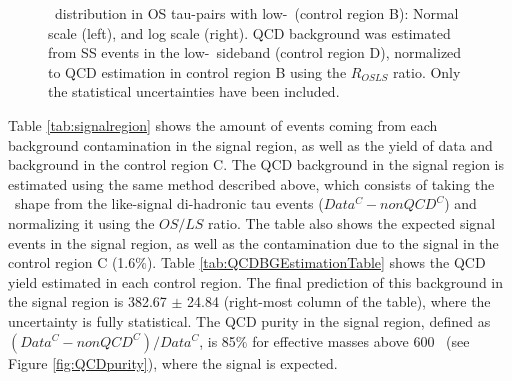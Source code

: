  \begin{figure}[ht]
 \begin{center}
 \captionsetup[subfloat]{farskip=0pt,captionskip=0.0cm,labelformat=empty}
 \end{center}
 \caption{\mass~distribution in OS tau-pairs with low-\MET~(control region B): Normal scale (left),
 and log scale (right). QCD background was estimated from SS events in the 
 low-\MET~sideband (control region D), normalized to QCD estimation in control region B 
 using the $R_{OSLS}$ ratio. Only the statistical uncertainties have been included.}
  \label{fig:CR_B}
 \end{figure}
 
\noindent Table \ref{tab:signalregion} shows the amount of events coming from each
background contamination in the signal region, as well as the yield of 
data and background in the control region C. The QCD background in the signal 
region is estimated using the same method described above, which consists of taking the \mass~shape
from the like-signal di-hadronic tau events ($Data^{C} - nonQCD^{C}$) and normalizing
it using the $OS/LS$ ratio. The table also shows the expected signal events in the signal 
region, as well as the contamination due to the signal in the control region C (1.6$\%$). Table \ref{tab:QCDBGEstimationTable} shows 
the QCD yield estimated in each control region. The final prediction of this background in the signal region 
is 382.67 $\pm$ 24.84 (right-most column of the table), where the uncertainty
is fully statistical. The QCD purity in the signal region, 
defined as $(Data^{C}-nonQCD^{C})/Data^{C}$, is 85$\%$ for effective 
masses above 600 \GeV~(see Figure \ref{fig:QCDpurity}), where 
the signal is expected.\\

